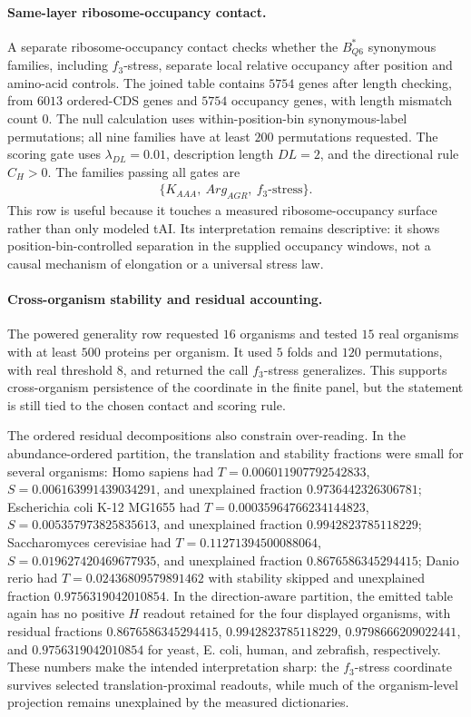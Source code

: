 \paragraph{Same-layer ribosome-occupancy contact.}
A separate ribosome-occupancy contact checks whether the $B^{*}_{Q6}$ synonymous families, including $f_3$-stress, separate local relative occupancy after position and amino-acid controls.  The joined table contains $5754$ genes after length checking, from $6013$ ordered-CDS genes and $5754$ occupancy genes, with length mismatch count $0$.  The null calculation uses within-position-bin synonymous-label permutations; all nine families have at least $200$ permutations requested.  The scoring gate uses $\lambda_{DL}=0.01$, description length $DL=2$, and the directional rule $C_H>0$.  The families passing all gates are
$$
\begin{aligned}
\{K_{AAA},\ Arg_{AGR},\ f_3\text{-stress}\}.
\end{aligned}
$$
This row is useful because it touches a measured ribosome-occupancy surface rather than only modeled tAI.  Its interpretation remains descriptive: it shows position-bin-controlled separation in the supplied occupancy windows, not a causal mechanism of elongation or a universal stress law.

\paragraph{Cross-organism stability and residual accounting.}
The powered generality row requested $16$ organisms and tested $15$ real organisms with at least $500$ proteins per organism.  It used $5$ folds and $120$ permutations, with real threshold $8$, and returned the call $f_3$-stress generalizes.  This supports cross-organism persistence of the coordinate in the finite panel, but the statement is still tied to the chosen contact and scoring rule.

The ordered residual decompositions also constrain over-reading.  In the abundance-ordered partition, the translation and stability fractions were small for several organisms: Homo sapiens had $T=0.006011907792542833$, $S=0.006163991439034291$, and unexplained fraction $0.9736442326306781$; Escherichia coli K-12 MG1655 had $T=0.00035964766234144823$, $S=0.005357973825835613$, and unexplained fraction $0.9942823785118229$; Saccharomyces cerevisiae had $T=0.11271394500088064$, $S=0.019627420469677935$, and unexplained fraction $0.8676586345294415$; Danio rerio had $T=0.02436809579891462$ with stability skipped and unexplained fraction $0.9756319042010854$.  In the direction-aware partition, the emitted table again has no positive $H$ readout retained for the four displayed organisms, with residual fractions $0.8676586345294415$, $0.9942823785118229$, $0.9798666209022441$, and $0.9756319042010854$ for yeast, E. coli, human, and zebrafish, respectively.  These numbers make the intended interpretation sharp: the $f_3$-stress coordinate survives selected translation-proximal readouts, while much of the organism-level projection remains unexplained by the measured dictionaries.


